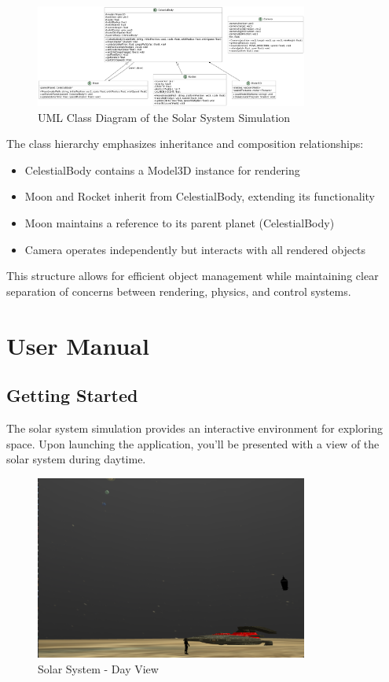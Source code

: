 \documentclass[12pt]{report}
\begin{document}
\begin{figure}[H]
\centering
\includegraphics[width=0.8\textwidth]{class_diagram.png}
\caption{UML Class Diagram of the Solar System Simulation}
\label{fig:class_diagram}
\end{figure}

The class hierarchy emphasizes inheritance and composition relationships:
\begin{itemize}
    \item CelestialBody contains a Model3D instance for rendering
    \item Moon and Rocket inherit from CelestialBody, extending its functionality
    \item Moon maintains a reference to its parent planet (CelestialBody)
    \item Camera operates independently but interacts with all rendered objects
\end{itemize}

This structure allows for efficient object management while maintaining clear separation of concerns between rendering, physics, and control systems.

\chapter{User Manual}

\section{Getting Started}
The solar system simulation provides an interactive environment for exploring space. Upon launching the application, you'll be presented with a view of the solar system during daytime.

\begin{figure}[H]
\centering
\includegraphics[width=0.8\textwidth]{day.png}
\caption{Solar System - Day View}
\label{fig:day_view}
\end{figure}
\end{document}
